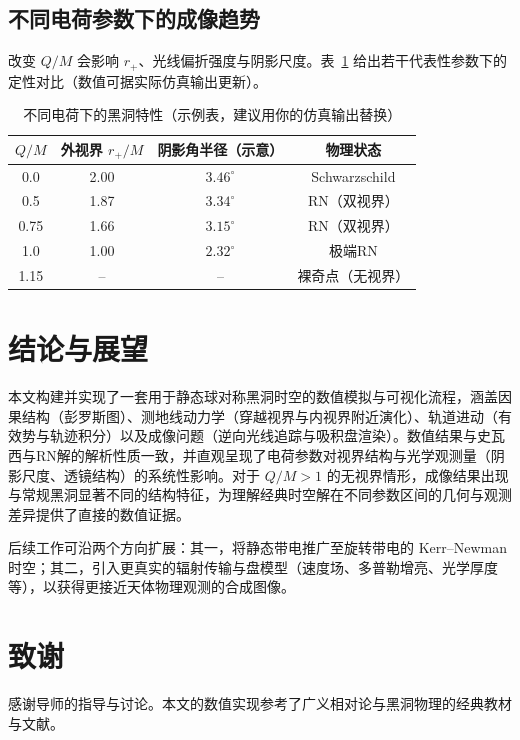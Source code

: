 \documentclass[a4paper,12pt]{article}
\numberwithin{equation}{section}
\begin{document}
\subsection{不同电荷参数下的成像趋势}

改变 $Q/M$ 会影响 $r_+$、光线偏折强度与阴影尺度。表~\ref{tab:charge} 给出若干代表性参数下的定性对比（数值可据实际仿真输出更新）。

\begin{table}[H]
\centering
\caption{不同电荷下的黑洞特性（示例表，建议用你的仿真输出替换）}
\label{tab:charge}
\begin{tabular}{cccc}
\toprule
$Q/M$ & 外视界 $r_+/M$ & 阴影角半径（示意） & 物理状态 \\
\midrule
0.0  & 2.00 & $3.46^\circ$ & Schwarzschild \\
0.5  & 1.87 & $3.34^\circ$ & RN（双视界） \\
0.75 & 1.66 & $3.15^\circ$ & RN（双视界） \\
1.0  & 1.00 & $2.32^\circ$ & 极端RN \\
1.15 & --   & --           & 裸奇点（无视界） \\
\bottomrule
\end{tabular}
\end{table}

\section{结论与展望}

本文构建并实现了一套用于静态球对称黑洞时空的数值模拟与可视化流程，涵盖因果结构（彭罗斯图）、测地线动力学（穿越视界与内视界附近演化）、轨道进动（有效势与轨迹积分）以及成像问题（逆向光线追踪与吸积盘渲染）。数值结果与史瓦西与RN解的解析性质一致，并直观呈现了电荷参数对视界结构与光学观测量（阴影尺度、透镜结构）的系统性影响。对于 $Q/M>1$ 的无视界情形，成像结果出现与常规黑洞显著不同的结构特征，为理解经典时空解在不同参数区间的几何与观测差异提供了直接的数值证据。

后续工作可沿两个方向扩展：其一，将静态带电推广至旋转带电的 Kerr--Newman 时空；其二，引入更真实的辐射传输与盘模型（速度场、多普勒增亮、光学厚度等），以获得更接近天体物理观测的合成图像。

\section*{致谢}
感谢导师的指导与讨论。本文的数值实现参考了广义相对论与黑洞物理的经典教材与文献。
\end{document}
